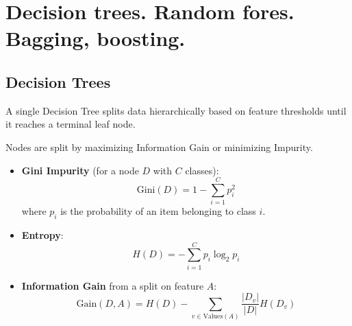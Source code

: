 
\section{Decision trees. Random fores. Bagging, boosting.}



	
	\subsection{Decision Trees}
	A single Decision Tree splits data hierarchically based on feature thresholds until it reaches a terminal leaf node.
	
	\begin{center}
	\end{center}	

	Nodes are split by maximizing Information Gain or minimizing Impurity. 
	
	\begin{itemize}
		\item \textbf{Gini Impurity} (for a node $D$ with $C$ classes):
		\begin{equation}
		\text{Gini}(D) = 1 - \sum_{i=1}^{C} p_i^2
		\end{equation}
		where $p_i$ is the probability of an item belonging to class $i$.
		
		\item \textbf{Entropy}:
		\begin{equation}
		H(D) = - \sum_{i=1}^{C} p_i \log_2 p_i
		\end{equation}
		
		\item \textbf{Information Gain} from a split on feature $A$:
		\begin{equation}
		\text{Gain}(D, A) = H(D) - \sum_{v \in \text{Values}(A)} \frac{|D_v|}{|D|} H(D_v)
		\end{equation}
	\end{itemize}
	
